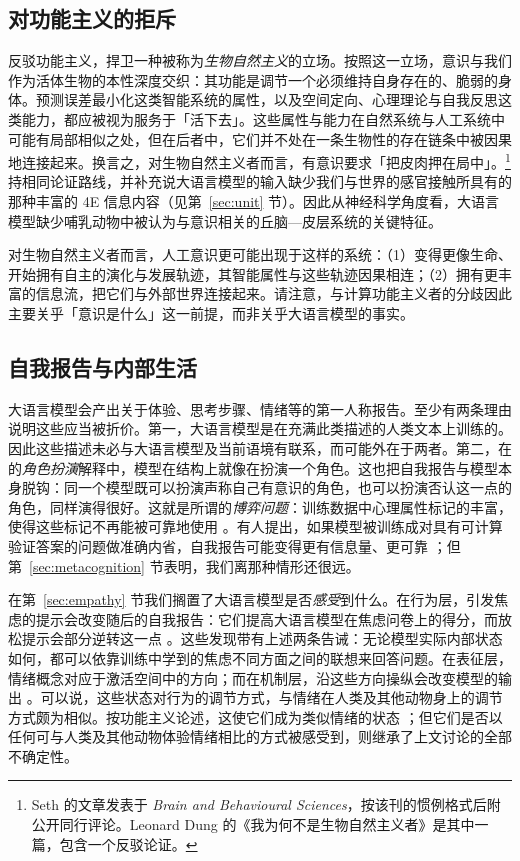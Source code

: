 \subsection{对功能主义的拒斥} \label{againstfunct}
\citep{seth2025conscious} 反驳功能主义，捍卫一种被称为\emph{生物自然主义}的立场。按照这一立场，意识与我们作为活体生物的本性深度交织：其功能是调节一个必须维持自身存在的、脆弱的身体。预测误差最小化这类智能系统的属性，以及空间定向、心理理论与自我反思这类能力，都应被视为服务于「活下去」。这些属性与能力在自然系统与人工系统中可能有局部相似之处，但在后者中，它们并不处在一条生物性的存在链条中被因果地连接起来。换言之，对生物自然主义者而言，有意识要求「把皮肉押在局中」。\footnote{Seth 的文章发表于 \textit{Brain and Behavioural Sciences}，按该刊的惯例格式后附公开同行评论。Leonard Dung 的《我为何不是生物自然主义者》是其中一篇，包含一个反驳论证。}\citet{aru2023feasibility} 持相同论证路线，并补充说大语言模型的输入缺少我们与世界的感官接触所具有的那种丰富的 4E 信息内容（见第~\ref{sec:unit} 节）。因此从神经科学角度看，大语言模型缺少哺乳动物中被认为与意识相关的丘脑—皮层系统的关键特征。

对生物自然主义者而言，人工意识更可能出现于这样的系统：（1）变得更像生命、开始拥有自主的演化与发展轨迹，其智能属性与这些轨迹因果相连；（2）拥有更丰富的信息流，把它们与外部世界连接起来。请注意，与计算功能主义者的分歧因此主要关乎「意识是什么」这一前提，而非关乎大语言模型的事实。

\subsection{自我报告与内部生活}\label{sec:selfreports}
大语言模型会产出关于体验、思考步骤、情绪等的第一人称报告。至少有两条理由说明这些应当被折价。第一，大语言模型是在充满此类描述的人类文本上训练的。因此这些描述未必与大语言模型及当前语境有联系，而可能外在于两者。第二，在 \citet{shanahan2023roleplaylargelanguagemodels} 的\emph{角色扮演}解释中，模型在结构上就像在扮演一个角色。这也把自我报告与模型本身脱钩：同一个模型既可以扮演声称自己有意识的角色，也可以扮演否认这一点的角色，同样演得很好。这就是所谓的\emph{博弈问题}：训练数据中心理属性标记的丰富，使得这些标记不再能被可靠地使用 \citep{birch2024gaming}。有人提出，如果模型被训练成对具有可计算验证答案的问题做准确内省，自我报告可能变得更有信息量、更可靠 \citep{perez2023eval}；但第~\ref{sec:metacognition} 节表明，我们离那种情形还很远。

在第~\ref{sec:empathy} 节我们搁置了大语言模型是否\emph{感受}到什么。在行为层，引发焦虑的提示会改变随后的自我报告：它们提高大语言模型在焦虑问卷上的得分，而放松提示会部分逆转这一点 \citep{BenZion2026anxiety}。这些发现带有上述两条告诫：无论模型实际内部状态如何，都可以依靠训练中学到的焦虑不同方面之间的联想来回答问题。在表征层，情绪概念对应于激活空间中的方向；而在机制层，沿这些方向操纵会改变模型的输出 \citep{zou2023representation}。可以说，这些状态对行为的调节方式，与情绪在人类及其他动物身上的调节方式颇为相似。按功能主义论述，这使它们成为类似情绪的状态 \citep{Moerland2018emotion}；但它们是否以任何可与人类及其他动物体验情绪相比的方式被感受到，则继承了上文讨论的全部不确定性。

